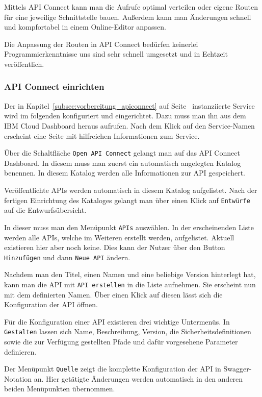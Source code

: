 Mittels API Connect kann man die Aufrufe optimal verteilen oder eigene Routen für eine jeweilige Schnittstelle bauen.
Außerdem kann man Änderungen schnell und kompfortabel in einem Online-Editor anpassen.

Die Anpassung der Routen in API Connect bedürfen keinerlei Programmierkenntnisse uns sind sehr schnell umgesetzt und in
Echtzeit veröffentlich.

\subsubsection{API Connect einrichten}
Der in Kapitel~\ref{subsec:vorbereitung_apiconnect} auf Seite~\pageref{subsec:vorbereitung_apiconnect} instanziierte
Service wird im folgenden konfiguriert und eingerichtet. Dazu muss man ihn aus dem IBM Cloud Dashboard heraus aufrufen.
Nach dem Klick auf den Service-Namen erscheint eine Seite mit hilfreichen Informationen zum Service.

Über die Schaltfläche \texttt{Open API Connect} gelangt man auf das API Connect Dashboard. In diesem muss man zuerst ein
automatisch angelegten Katalog benennen. In diesem Katalog werden alle Informationen zur API gespeichert.

Veröffentlichte APIs werden automatisch in diesem Katalog aufgelistet. Nach der fertigen Einrichtung des Kataloges
gelangt man über einen Klick auf \texttt{Entwürfe} auf die Entwurfsübersicht.

In dieser muss man den Menüpunkt \texttt{APIs} auswählen. In der erscheinenden Liste werden alle APIs, welche im Weiteren
erstellt werden, aufgelistet. Aktuell existieren hier aber noch keine. Dies kann der Nutzer über den Button
\texttt{Hinzufügen} und dann \texttt{Neue API} ändern.

Nachdem man den Titel, einen Namen und eine beliebige Version hinterlegt hat, kann man die API mit \texttt{API erstellen}
in die Liste aufnehmen. Sie erscheint nun mit dem definierten Namen. Über einen Klick auf diesen lässt sich die
Konfiguration der API öffnen.

Für die Konfiguration einer API existieren drei wichtige Untermenüs. In \texttt{Gestalten} lassen sich Name, Beschreibung,
Version, die Sicherheitsdefinitionen sowie die zur Verfügung gestellten Pfade und dafür vorgesehene Parameter definieren.

Der Menüpunkt \texttt{Quelle} zeigt die komplette Konfiguration der API in Swagger-Notation an. Hier getätigte Änderungen
werden automatisch in den anderen beiden Menüpunkten übernommen.

